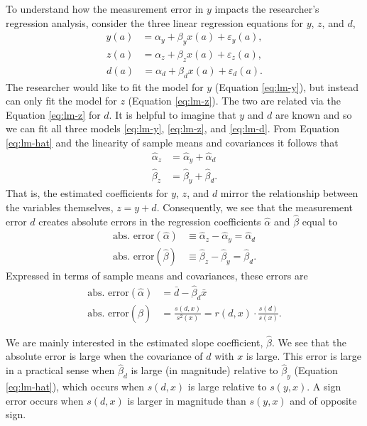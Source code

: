 \documentclass[
]{article}
\begin{document}
To understand how the measurement error in \(y\) impacts the researcher's regression analysis, consider the three linear regression equations for \(y\), \(z\), and \(d\),
\begin{align}
  \label{eq:lm-y}
  y(a) &= \alpha_y + \beta_y x(a) + \varepsilon_y(a),
\end{align}
\begin{align}
  \label{eq:lm-z}
  z(a) &= \alpha_z + \beta_z x(a) + \varepsilon_z(a),
\end{align}
\begin{align}
  \label{eq:lm-d}
  d(a) &= \alpha_d + \beta_d x(a) + \varepsilon_d(a).
\end{align}
The researcher would like to fit the model for \(y\) (Equation \eqref{eq:lm-y}), but instead can only fit the model for \(z\) (Equation \eqref{eq:lm-z}).
The two are related via the Equation \eqref{eq:lm-z} for \(d\).
It is helpful to imagine that \(y\) and \(d\) are known and so we can fit all three models \eqref{eq:lm-y}, \eqref{eq:lm-z}, and \eqref{eq:lm-d}.
From Equation \eqref{eq:lm-hat} and the linearity of sample means and covariances it follows that
\begin{align}
  \label{eq:lm-hat-rel}
  \hat \alpha_z &= \hat \alpha_y + \hat \alpha_d \\
  \hat \beta_z &= \hat \beta_y + \hat \beta_d.
\end{align}
That is, the estimated coefficients for \(y\), \(z\), and \(d\) mirror the relationship between the variables themselves, \(z = y + d\).
Consequently, we see that the measurement error \(d\) creates absolute errors in the regression coefficients \(\hat \alpha\) and \(\hat \beta\) equal to
\begin{align}
  \label{eq:lm-hat-err}
  \text{abs. error}(\hat \alpha) &\equiv \hat \alpha_z - \hat \alpha_y = \hat \alpha_d \\
  \text{abs. error}(\hat \beta) &\equiv \hat \beta_z - \hat \beta_y = \hat \beta_d.
\end{align}
Expressed in terms of sample means and covariances, these errors are
\begin{align}
  \label{eq:lm-hat-err-1}
  \text{abs. error}(\hat \alpha) &= \bar d - \hat \beta_d \bar x \\
  \text{abs. error}(\hat \beta)  &= \frac{s(d,x)}{s^2(x)} = r(d,x) \cdot \frac{s(d)}{s(x)}.
\end{align}

We are mainly interested in the estimated slope coefficient, \(\hat \beta\).
We see that the absolute error is large when the covariance of \(d\) with \(x\) is large.
This error is large in a practical sense when \(\hat \beta_{d}\) is large (in magnitude) relative to \(\hat \beta_y\) (Equation \eqref{eq:lm-hat}), which occurs when \(s(d,x)\) is large relative to \(s(y,x)\).
A sign error occurs when \(s(d,x)\) is larger in magnitude than \(s(y,x)\) and of opposite sign.
\end{document}
